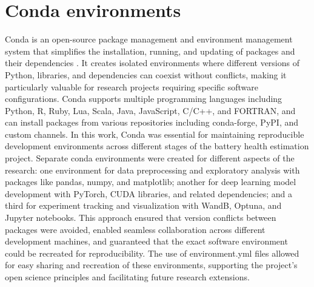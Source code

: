 \section{Conda environments}
Conda is an open-source package management and environment management system that simplifies the installation, running, and updating of packages and their dependencies \cite{conda_contributors_conda_2025}. It creates isolated environments where different versions of Python, libraries, and dependencies can coexist without conflicts, making it particularly valuable for research projects requiring specific software configurations. Conda supports multiple programming languages including Python, R, Ruby, Lua, Scala, Java, JavaScript, C/C++, and FORTRAN, and can install packages from various repositories including conda-forge, PyPI, and custom channels. In this work, Conda was essential for maintaining reproducible development environments across different stages of the battery health estimation project. Separate conda environments were created for different aspects of the research: one environment for data preprocessing and exploratory analysis with packages like pandas, numpy, and matplotlib; another for deep learning model development with PyTorch, CUDA libraries, and related dependencies; and a third for experiment tracking and visualization with WandB, Optuna, and Jupyter notebooks. This approach ensured that version conflicts between packages were avoided, enabled seamless collaboration across different development machines, and guaranteed that the exact software environment could be recreated for reproducibility. The use of environment.yml files allowed for easy sharing and recreation of these environments, supporting the project's open science principles and facilitating future research extensions.

